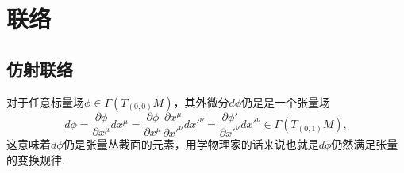 \section{联络}
	\subsection{仿射联络}
		对于任意标量场$\phi\in \varGamma(T_{(0,0)}M)$，其外微分$d\phi$仍是是一个张量场
		\begin{equation}
				 d\phi=\frac{\partial\phi}{\partial x^\mu}dx^\mu=\frac{\partial\phi}{\partial {x}^\mu}\frac{\partial{x}^\mu}{\partial {x'}^\nu}d{x'}^\nu=\frac{\partial{\phi'}}{\partial {x'}^\nu}d{x'}^\nu\in \varGamma(T_{(0,1)}M),
		\end{equation}
		这意味着$d\phi$仍是张量丛截面的元素，用学物理家的话来说也就是$d\phi$仍然满足张量的变换规律.
		
